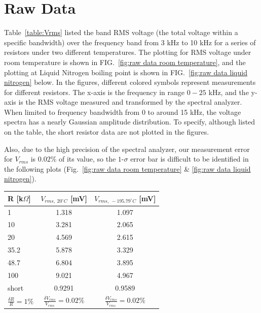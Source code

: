 \documentclass[12pt]{article}
\begin{document}
\section{Raw Data}

\quad Table~\ref{table:Vrms} listed the band RMS voltage (the total voltage within a specific bandwidth) over the frequency band from 3 kHz to 10 kHz for a series of resistors under two different temperatures. The plotting for RMS voltage under room temperature is shown in FIG.~\ref{fig:raw data room temperature}, and the plotting at Liquid Nitrogen boiling point is shown in FIG.~\ref{fig:raw data liquid nitrogen} below.    In the figures, different colored symbols represent measurements for different resistors. The x-axis is the frequency in range $0-25$ kHz, and the y-axis is the RMS voltage measured and transformed by the spectral analyzer. When limited to frequency bandwidth from 0 to around 15 kHz, the voltage spectra has a nearly Gaussian amplitude distribution. To specify, although listed on the table, the short resistor data are not plotted in the figures.

\quad Also, due to the high precision of the spectral analyzer, our measurement error for $V_{rms}$ is $0.02\%$ of its value, so the $1$-$\sigma$ error bar is difficult to be identified in the following plots (Fig.~\ref{fig:raw data room temperature} \& \ref{fig:raw data liquid nitrogen}).  
\begin{center}
    \centering
    \begin{tabular}{| l | c | c |}
    \hline
    R [k$\Omega$] & $V_{rms,~20^\circ C}$ [mV] & $V_{rms,~-195.79^\circ C}$ [mV]\\
    \hline
    \hline
    1 & 1.318 & 1.097\\
    10 & 3.281 & 2.065\\
    20 & 4.569 & 2.615\\
    35.2 & 5.878 & 3.329 \\
    48.7 & 6.804 & 3.895\\
    100 & 9.021 & 4.967\\
    short & 0.9291 & 0.9589 \\
    \hline
    $\frac{\delta R}{R} = 1\%$& $\frac{\delta V_{rms}}{V_{rms}} = 0.02\%$&$\frac{\delta V_{rms}}{V_{rms}} = 0.02\%$ \\
    \hline
    \end{tabular}
     \label{table:Vrms}
\end{center}
\end{document}

